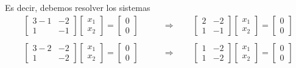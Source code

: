 \documentclass{beamer} %
\begin{document}
\begin{frame}
    Es decir,  debemos resolver los sistemas
    \begin{align*}
        \begin{bmatrix}
            3 - 1&-2 \\ 1&-1
        \end{bmatrix}
        \begin{bmatrix}
            x_1\\x_2
        \end{bmatrix}
        =
        \begin{bmatrix}
            0\\0
        \end{bmatrix}
        \qquad &\Rightarrow \qquad 
        \begin{bmatrix} 2&-2 \\ 1&-1 \end{bmatrix}
        \begin{bmatrix}
            x_1\\x_2
        \end{bmatrix}
        =
        \begin{bmatrix}
            0\\0
        \end{bmatrix} \tag{S1}
        \\
        &
        \\
        \begin{bmatrix}
            3 - 2&-2 \\ 1&-2
        \end{bmatrix}
        \begin{bmatrix}
            x_1\\x_2
        \end{bmatrix}
        =
        \begin{bmatrix}
            0\\0
        \end{bmatrix}
        \qquad &\Rightarrow \qquad 
        \begin{bmatrix}1&-2 \\ 1&-2\end{bmatrix}
        \begin{bmatrix}
            x_1\\x_2
        \end{bmatrix}
        =
        \begin{bmatrix}
            0\\0
        \end{bmatrix} \tag{S2}

\end{align*}
\end{frame}
\end{document}
